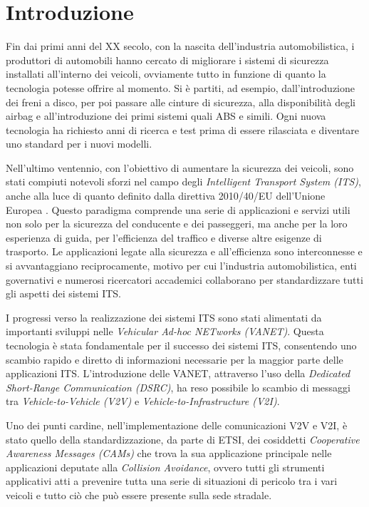 \chapter{Introduzione}

Fin dai primi anni del XX secolo, con la nascita dell'industria automobilistica, i produttori di automobili hanno cercato di migliorare i sistemi di sicurezza installati all'interno dei veicoli, ovviamente tutto in funzione di quanto la tecnologia potesse offrire al momento. Si è partiti, ad esempio, dall'introduzione dei freni a disco, per poi passare alle cinture di sicurezza, alla disponibilità degli airbag e all'introduzione dei primi sistemi quali ABS e simili. Ogni nuova tecnologia ha richiesto anni di ricerca e test prima di essere rilasciata e diventare uno standard per i nuovi modelli.

Nell'ultimo ventennio, con l'obiettivo di aumentare la sicurezza dei veicoli, sono stati compiuti notevoli sforzi nel campo degli \textit{Intelligent Transport System (ITS)}, anche alla luce di quanto definito dalla direttiva 2010/40/EU dell'Unione Europea \cite{2010-40}. Questo paradigma comprende una serie di applicazioni e servizi utili non solo per la sicurezza del conducente e dei passeggeri, ma anche per la loro esperienza di guida, per l'efficienza del traffico e diverse altre esigenze di trasporto. Le applicazioni legate alla sicurezza e all'efficienza sono interconnesse e si avvantaggiano reciprocamente, motivo per cui l'industria automobilistica, enti governativi e numerosi ricercatori accademici collaborano per standardizzare tutti gli aspetti dei sistemi ITS.

I progressi verso la realizzazione dei sistemi ITS sono stati alimentati da importanti sviluppi nelle \textit{Vehicular Ad-hoc NETworks (VANET)}. Questa tecnologia è stata fondamentale per il successo dei sistemi ITS, consentendo uno scambio rapido e diretto di informazioni necessarie per la maggior parte delle applicazioni ITS. L'introduzione delle VANET, attraverso l'uso della \textit{Dedicated Short-Range Communication (DSRC)}, ha reso possibile lo scambio di messaggi tra \textit{Vehicle-to-Vehicle (V2V)} e \textit{Vehicle-to-Infrastructure (V2I)}.

Uno dei punti cardine, nell'implementazione delle comunicazioni V2V e V2I, è stato quello della standardizzazione, da parte di ETSI, dei cosiddetti \textit{Cooperative Awareness Messages (CAMs)} che trova la sua applicazione principale nelle applicazioni deputate alla \textit{Collision Avoidance}, ovvero tutti gli strumenti applicativi atti a prevenire tutta una serie di situazioni di pericolo tra i vari veicoli e tutto ciò che può essere presente sulla sede stradale.

